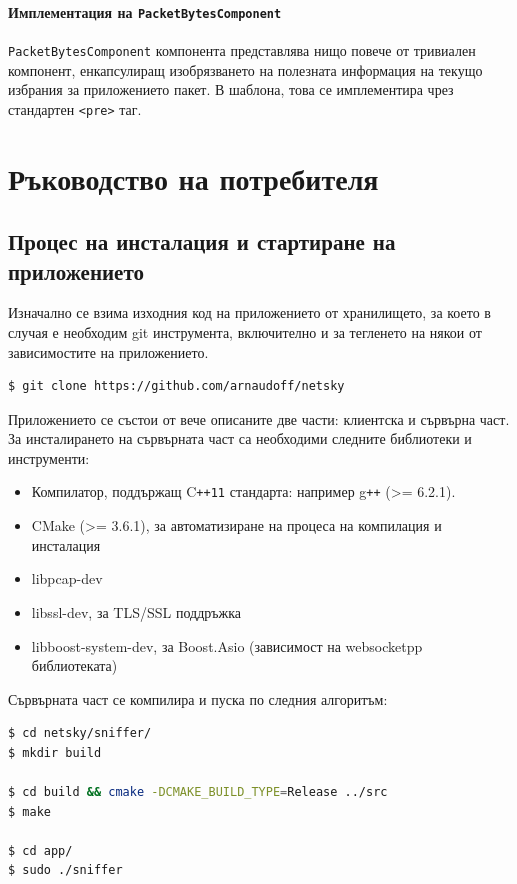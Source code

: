 \documentclass[12pt,a4paper,oneside]{book}
\begin{document}
\subsubsection{Имплементация на \texttt{PacketBytesComponent}}

\texttt{PacketBytesComponent} компонента представлява нищо повече от тривиален
компонент, енкапсулиращ изобрязването на полезната информация на текущо избрания
за приложението пакет. В шаблона, това се имплементира чрез стандартен
\texttt{<pre>} таг.

\chapter{Ръководство на потребителя}

\section{Процес на инсталация и стартиране на приложението}

Изначално се взима изходния код на приложението от хранилището, за което в
случая е необходим git инструмента, включително и
за тегленето на някои от зависимостите на приложението.

\begin{lstlisting}[language=bash,caption=Взимане на изходния код на приложението чрез
  \texttt{git}]
$ git clone https://github.com/arnaudoff/netsky
\end{lstlisting}

Приложението се състои от вече описаните две части: клиентска и сървърна част.
За инсталирането на сървърната част са необходими следните библиотеки и
инструменти:

\begin{itemize}
  \item
    Компилатор, поддържащ C\texttt{++11} стандарта: например g\texttt{++} (>= 6.2.1).
  \item
    CMake (>= 3.6.1), за автоматизиране на процеса на компилация и инсталация
  \item
    libpcap-dev
  \item
    libssl-dev, за TLS/SSL поддръжка
  \item
    libboost-system-dev, за Boost.Asio (зависимост на websocketpp библиотеката)
\end{itemize}

Сървърната част се компилира и пуска по следния алгоритъм:

\begin{lstlisting}[language=bash,caption=Компилиране и пускане на сървърната част на
  приложението]
$ cd netsky/sniffer/
$ mkdir build

$ cd build && cmake -DCMAKE_BUILD_TYPE=Release ../src
$ make

$ cd app/
$ sudo ./sniffer
\end{lstlisting}
\end{document}

